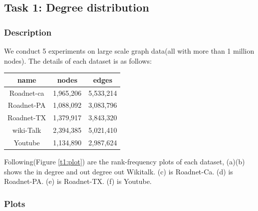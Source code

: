 \subsection{Task 1: Degree distribution}

\subsubsection{Description}
We conduct 5 experiments on large scale graph data(all with more than 1 million nodes). The details of each dataset is as follows: \\

\begin{center}
\begin{tabular}{| c | c | c |}
    \hline
    name & nodes & edges \\ \hline
    Roadnet-ca & 1,965,206 & 5,533,214 \\ \hline
    Roadnet-PA & 1,088,092 & 3,083,796 \\ \hline
    Roadnet-TX & 1,379,917 & 3,843,320 \\ \hline
    wiki-Talk & 2,394,385 & 5,021,410 \\ \hline
    Youtube & 1,134,890 & 2,987,624 \\ \hline
\end{tabular}
\end{center}


Following(Figure \ref{t1:plot}) are the rank-frequency plots of each dataset, (a)(b) shows the in degree and out degree out Wikitalk. (c) is Roadnet-Ca. (d) is Roadnet-PA. (e) is Roadnet-TX. (f) is Youtube. 

\subsubsection{Plots}

